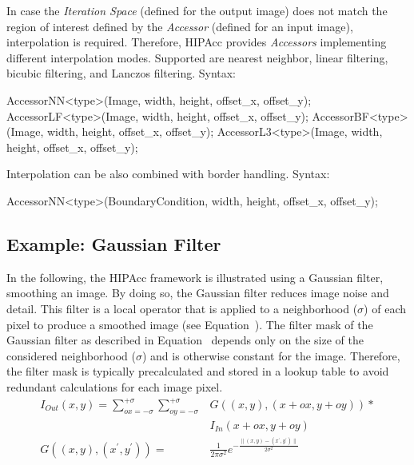 \begin{itemize}
    In case the {\em Iteration Space} (defined for the output image) does not
    match the region of interest defined by the {\em Accessor} (defined for an
    input image), interpolation is required. Therefore, \ac{HIPAcc} provides
    {\em Accessors} implementing different interpolation modes. Supported are
    nearest neighbor, linear filtering, bicubic filtering, and Lanczos
    filtering. Syntax:\\
\begin{code}
AccessorNN<type>(Image, width, height, offset_x, offset_y);
AccessorLF<type>(Image, width, height, offset_x, offset_y);
AccessorBF<type>(Image, width, height, offset_x, offset_y);
AccessorL3<type>(Image, width, height, offset_x, offset_y);
\end{code}

    Interpolation can be also combined with border handling. Syntax:\\
\begin{code}
AccessorNN<type>(BoundaryCondition, width, height, offset_x, offset_y);
\end{code}
\end{itemize}


\subsection{Example: Gaussian Filter}\label{sec:gaussian_filter}
In the following, the \ac{HIPAcc} framework is illustrated using a Gaussian filter, smoothing an image. By doing so, the Gaussian filter reduces image noise and detail. This filter is a local operator that is applied to a neighborhood ($\sigma$) of each pixel to produce a smoothed image (see Equation~). The filter mask of the Gaussian filter as described in Equation~ depends only on the size of the considered neighborhood ($\sigma$) and is otherwise constant for the image. Therefore, the filter mask is typically precalculated and stored in a lookup table to avoid redundant calculations for each image pixel.
{\small
\begin{align}
    I_{Out}(x,y) = \sum_{ox=-\sigma}^{+\sigma} \sum_{oy=-\sigma}^{+\sigma} &G((x,y),(x+ox,y+oy)) *\nonumber\\
                                                                       &I_{In}(x+ox,y+oy) \label{eq:01} \\[2ex]
    G((x,y),(x^\prime,y^\prime)) = &\frac{1}{2\pi \sigma^2} e^{-\frac{\|(x,y) - (x^\prime,y^\prime)\|}{2 \sigma^2}} \label{eq:02}
\end{align}}

